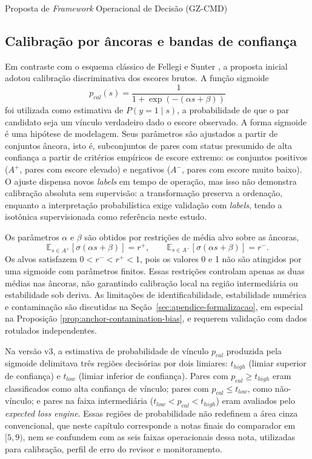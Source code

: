 \begin{chapter}{Proposta de \textit{Framework} Operacional de Decisão (GZ-CMD)}
\subsection{Calibração por âncoras e bandas de confiança}
\label{sec:cap8-calibracao}

Em contraste com o esquema clássico de Fellegi e Sunter \cite{Fellegi1969theory}, a proposta inicial adotou calibração discriminativa dos escores brutos. A função sigmoide
\[
p_{cal}(s)=\frac{1}{1+\exp\left(-\left(\alpha s+\beta\right)\right)}
\]
foi utilizada como estimativa de $P(y{=}1\mid s)$, a probabilidade de que o par candidato seja um vínculo verdadeiro dado o escore observado. A forma sigmoide é uma hipótese de modelagem. Seus parâmetros são ajustados a partir de conjuntos âncora, isto é, subconjuntos de pares com status presumido de alta confiança a partir de critérios empíricos de escore extremo: os conjuntos positivos ($A^+$, pares com escore elevado) e negativos ($A^-$, pares com escore muito baixo). O ajuste dispensa novos \textit{labels} em tempo de operação, mas isso não demonstra calibração absoluta sem supervisão: a transformação preserva a ordenação, enquanto a interpretação probabilística exige validação com \textit{labels}, tendo a isotônica supervisionada como referência neste estudo.

Os parâmetros $\alpha$ e $\beta$ são obtidos por restrições de média alvo sobre as âncoras,
\[
\mathbb{E}_{s\in A^+}[\sigma(\alpha s+\beta)] = r^+,
\qquad
\mathbb{E}_{s\in A^-}[\sigma(\alpha s+\beta)] = r^-.
\]
Os alvos satisfazem $0<r^-<r^+<1$, pois os valores 0 e 1 não são atingidos por uma sigmoide com parâmetros finitos. Essas restrições controlam apenas as duas médias nas âncoras, não garantindo calibração local na região intermediária ou estabilidade sob deriva. As limitações de identificabilidade, estabilidade numérica e contaminação são discutidas na Seção~\ref{sec:apendice-formalizacao}, em especial na Proposição \ref{prop:anchor-contamination-bias}, e requerem validação com dados rotulados independentes.

Na versão v3, a estimativa de probabilidade de vínculo $p_{cal}$ produzida pela sigmoide delimitava três regiões decisórias por dois limiares: $t_{high}$ (limiar superior de confiança) e $t_{low}$ (limiar inferior de confiança). Pares com $p_{cal}\geq t_{high}$ eram classificados como alta confiança de vínculo; pares com $p_{cal}\leq t_{low}$, como não-vínculo; e pares na faixa intermediária ($t_{low}<p_{cal}<t_{high}$) eram avaliados pelo \textit{expected loss engine}. Essas regiões de probabilidade não redefinem a área cinza convencional, que neste capítulo corresponde a notas finais do comparador em $[5,9)$, nem se confundem com as seis faixas operacionais dessa nota, utilizadas para calibração, perfil de erro do revisor e monitoramento.


\end{chapter}
